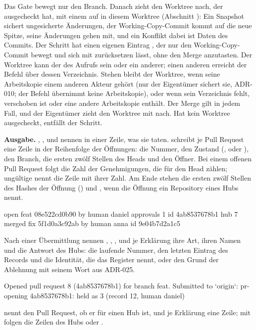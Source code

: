 Das Gate bewegt nur den Branch.
Danach zieht  den Worktree nach, der  ausgecheckt hat,
mit einem  auf  in diesem Worktree (Abschnitt ):
Ein Snapshot sichert ungesicherte Änderungen, der Working-Copy-Commit kommt auf die neue Spitze,
seine Änderungen gehen mit, und ein Konflikt dabei ist Daten des Commits.
Der Schritt hat einen eigenen Eintrag , der nur den Working-Copy-Commit bewegt
und sich mit  zurücksetzen lässt, ohne den Merge anzutasten.
Der Worktree kann der des Aufrufs sein oder ein anderer;
einen anderen erreicht der Befehl über dessen Verzeichnis.
Stehen bleibt der Worktree, wenn seine Arbeitskopie einem anderen Akteur gehört
(nur der Eigentümer sichert sie, ADR-010; der Befehl übernimmt keine Arbeitskopie),
oder wenn sein Verzeichnis fehlt, verschoben ist oder eine andere Arbeitskopie enthält.
Der Merge gilt in jedem Fall, und der Eigentümer zieht den Worktree mit  nach.
Hat kein Worktree  ausgecheckt, entfällt der Schritt.

{\bf Ausgabe.} , ,  und  nennen in einer Zeile,
was sie taten.  schreibt je Pull Request eine Zeile in der Reihenfolge der
Öffnungen: die Nummer, den Zustand (,  oder ), den Branch,
die ersten zwölf Stellen des Heads und den Öffner. Bei einem offenen Pull Request folgt die Zahl
der Genehmigungen, die für den Head zählen; ungültige nennt die Zeile mit ihrer Zahl.
Am Ende stehen die ersten zwölf Stellen des Hashes der Öffnung () und , wenn
die Öffnung ein Repository eines Hubs nennt.

 open feat 08e522cd0b90 by human daniel approvals 1 id 4ab8537678b1 hub
7 merged fix 5f1d0a3c92ab by human anna id 9e04b7d2a1c5
\stoptyping

Nach einer Übermittlung nennen , , ,  und
 je
Erklärung ihre Art, ihren Namen und die Antwort des Hubs: die laufende Nummer, den letzten
Eintrag des Records und die Identität, die das Register nennt, oder den Grund der Ablehnung mit
seinem Wort aus ADR-025.

\starttyping
Opened pull request 8 (4ab8537678b1) for branch feat.
Submitted to `origin`:
  pr-opening 4ab8537678b1: held as 3 (record 12, human daniel)
\stoptyping

 nennt den Pull Request, ob er für einen Hub ist, und je Erklärung eine Zeile; mit
 folgen die Zeilen des Hubs oder .

